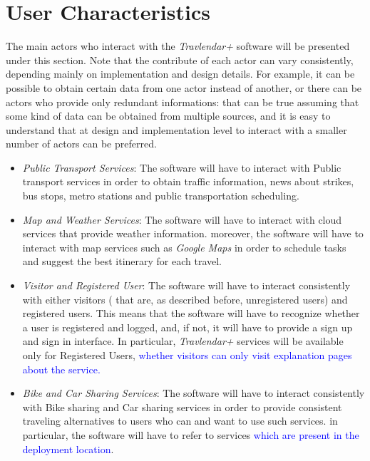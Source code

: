 \section{User Characteristics}
The main actors who interact with the \emph{Travlendar+} software will be presented under this section. Note that the contribute of each actor can vary consistently, depending mainly on implementation and design details. For example, it can be possible to obtain certain data from one actor instead of another, or there can be actors who provide only redundant informations: that can be true assuming that some kind of data can be obtained from multiple sources, and it is easy to understand that at design and implementation level to interact with a smaller number of actors can be preferred.
\begin{itemize}

	\item \emph{Public Transport Services}: The software will have to interact with Public transport services in order to obtain traffic information, news about strikes, bus stops, metro stations and public transportation scheduling.
    
    \item \emph{Map and Weather Services}: The software will have to interact with cloud services that provide weather information. moreover, the software will have to interact with map services such as \emph{Google Maps} in order to schedule tasks and suggest the best itinerary for each travel.
    
    \item \emph{Visitor and Registered User}: The software will have to interact consistently with either visitors ( that are, as described before, unregistered users) and registered users. This means that the software will have to recognize whether a user is registered and logged, and, if not, it will have to provide a sign up and sign in interface. In particular, \emph{Travlendar+} services will be available only for Registered Users, \textcolor{blue}{whether visitors can only visit explanation pages about the service.}
    
    \item \emph{Bike and Car Sharing Services}: The software will have to interact consistently with Bike sharing and Car sharing services in order to provide consistent traveling alternatives to users who can and want to use such services. in particular, the software will have to refer to services \textcolor{blue}{which are present in the deployment location}. 
    

\end{itemize}
